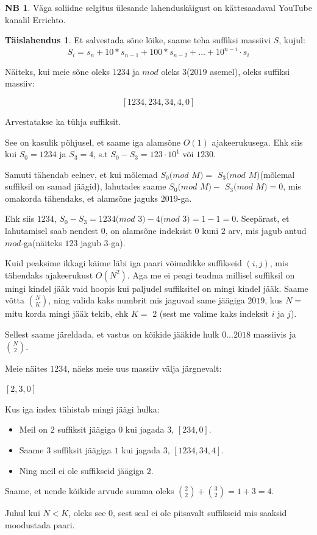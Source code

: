 \documentclass{trkut}
\theoremstyle{definition}
\newtheorem*{extra}{NB}
\newtheorem*{solution}{Täislahendus}
\begin{document}
\begin{extra}
Väga soliidne selgitus ülesande lahenduskäigust on kättesaadaval YouTube kanalil Errichto.
\end{extra}
\begin{solution}
Et salvestada sõne lõike, saame teha suffiksi massiivi $S$, kujul:
$${S_i = s_n + 10*s_{n-1} +100*s_{n-2} + ... + {10^{n-i}} \cdot s_{i}}$$

Näiteks, kui meie sõne oleks $1234$ ja $mod$ oleks $3$($2019$ asemel), oleks suffiksi massiiv:

$$[1234, 234, 34, 4, 0]$$

Arvestatakse ka tühja suffiksit.

See on kasulik põhjusel, et saame iga alamsõne $O(1)$ ajakeerukusega.
Ehk siis kui ${S_0} = 1234$ ja  ${S_3=4}$, s.t ${S_0}-{S_3} = 123 \cdot {10^1}$ või $1230$.

Samuti tähendab eelnev, et kui mõlemad ${S_0}(mod$ $M)=$ ${S_3}(mod$ $M)$(mõlemal suffiksil on samad jäägid), lahutades saame ${S_0}(mod$ $M)-$ ${S_3}(mod$ $M)=0$, mis omakorda tähendaks, et alamsõne jaguks $2019$-ga.

Ehk siis $1234$, ${S_0-{S_3}=1234(mod}$ $3)-4(mod$ $3)=1-1=0$. Seepärast, et lahutamisel saab nendest $0$, on alamsõne indeksist $0$ kuni $2$ arv, mis jagub antud $mod$-ga(näiteks $123$ jagub $3$-ga). 

Kuid peaksime ikkagi käime läbi iga paari võimalikke suffikseid $(i, j)$, mis tähendaks ajakeerukust $O(N^2)$. 
Aga me ei peagi teadma millisel suffiksil on mingi kindel jääk vaid hoopis kui paljudel suffiksitel on mingi kindel jääk.
Saame võtta ${N \choose K}$, ning valida kaks numbrit mis jaguvad same jäägiga $2019$, kus $N=$ mitu korda mingi jääk tekib, ehk $K=$ 2 (sest me valime kaks indeksit $i$ ja $j$).

Sellest saame järeldada, et vastus on kõikide jääkide hulk $0...2018$ massiivis ja ${N \choose 2}$.

Meie näites $1234$, näeks meie uus massiiv välja järgnevalt:

$[2, 3, 0]$

Kus iga index tähistab mingi jäägi hulka:
\begin{itemize}
\item Meil on $2$ suffiksit jäägiga $0$ kui jagada $3$, $[234, 0]$.
\item Saame $3$ suffiksit jäägiga $1$ kui jagada $3$, $[1234, 34, 4]$.
\item Ning meil ei ole suffikseid jäägiga $2$.
\end{itemize}

Saame, et nende kõikide arvude summa oleks ${2 \choose 2} + {3 \choose 2}=1+3=4$.

Juhul kui $N<K$, oleks see $0$, sest seal ei ole piisavalt suffikseid mis saaksid moodustada paari.

\end{solution}
\end{document}
